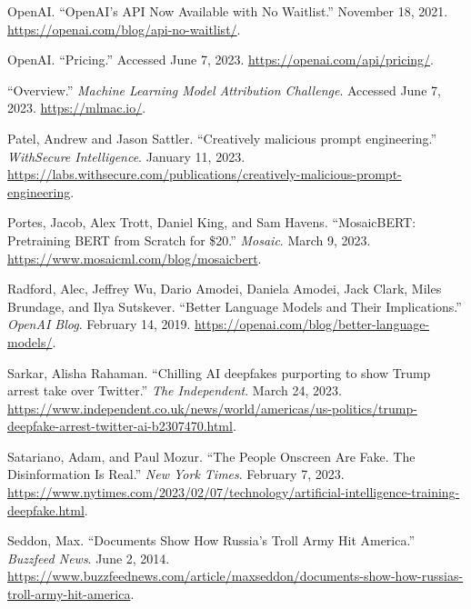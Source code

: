 \documentclass{article}
\begin{document}
\begin{thebibliography}{9}
  OpenAI. ``OpenAI's API Now Available with No Waitlist.'' November 18, 2021. \href{https://openai.com/blog/api-no-waitlist/}{https://openai.com/blog/api-no-waitlist/}.

  OpenAI. ``Pricing.'' Accessed June 7, 2023. \href{https://openai.com/api/pricing/}{https://openai.com/api/pricing/}.

  ``Overview.'' \textit{Machine Learning Model Attribution Challenge}. Accessed June 7, 2023. \href{https://mlmac.io/}{https://mlmac.io/}. 

  Patel, Andrew and Jason Sattler. ``Creatively malicious prompt engineering.'' \textit{WithSecure Intelligence}. January 11, 2023. \href{https://labs.withsecure.com/publications/creatively-malicious-prompt-engineering}{https://labs.withsecure.com/publications/creatively-malicious-prompt-engineering}. 

  Portes, Jacob, Alex Trott, Daniel King, and Sam Havens. ``MosaicBERT: Pretraining BERT from Scratch for \$20.'' \textit{Mosaic}. March 9, 2023. \href{https://www.mosaicml.com/blog/mosaicbert}{https://www.mosaicml.com/blog/mosaicbert}. 

  Radford, Alec, Jeffrey Wu, Dario Amodei, Daniela Amodei, Jack Clark, Miles Brundage, and Ilya Sutskever. ``Better Language Models and Their Implications.'' \textit{OpenAI Blog}. February 14, 2019. \href{https://openai.com/blog/better-language-models/}{https://openai.com/blog/better-language-models/}.

  Sarkar, Alisha Rahaman. ``Chilling AI deepfakes purporting to show Trump arrest take over Twitter.'' \textit{The Independent}. March 24, 2023. \href{https://www.independent.co.uk/news/world/americas/us-politics/trump-deepfake-arrest-twitter-ai-b2307470.html}{https://www.independent.co.uk/news/world/americas/us-politics/trump-deepfake-arrest-twitter-ai-b2307470.html}. 

  Satariano, Adam, and Paul Mozur. ``The People Onscreen Are Fake. The Disinformation Is Real.'' \textit{New York Times}. February 7, 2023. \href{https://www.nytimes.com/2023/02/07/technology/artificial-intelligence-training-deepfake.html}{https://www.nytimes.com/2023/02/07/technology/artificial-intelligence-training-deepfake.html}. 

  Seddon, Max. ``Documents Show How Russia’s Troll Army Hit America.'' \textit{Buzzfeed News}. June 2, 2014. \href{https://www.buzzfeednews.com/article/maxseddon/documents-show-how-russias-troll-army-hit-america}{https://www.buzzfeednews.com/article/maxseddon/documents-show-how-russias-troll-army-hit-america}.


\end{thebibliography}
\end{document}
